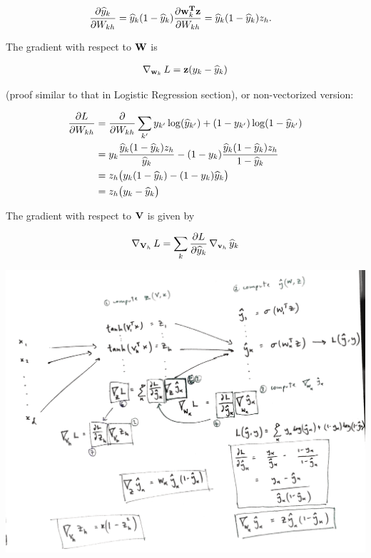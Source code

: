 \begin{align*}
  \frac{\partial \widehat{y}_k}{\partial W_{kh}} &= \widehat{y}_k (1 - \widehat{y}_k) \frac{\partial \mathbf w_k^{\mathbf{T}} \mathbf z}{\partial W_{kh}} = \widehat{y}_k (1 - \widehat{y}_k)z_h.
\end{align*}

The gradient with respect to $\mathbf W$ is

\begin{align*}
  \operatorname{\nabla}_{\mathbf w_k} L = \mathbf z(y_k - \widehat{y}_k)
\end{align*}

(proof similar to that in Logistic Regression section), or non-vectorized version:

\begin{align*}
  \frac{\partial L}{\partial W_{kh}}
  &= \frac{\partial }{\partial W_{kh}} \sum_{k'} y_{k'} \log(\widehat{y}_{k'}) + (1 - y_{k'}) \log( 1 - \widehat{y}_{k'}) \\
  &=        y_k      \frac{ \widehat{y}_k (1 - \widehat{y}_k)z_h }{ \widehat{y}_k } -
           (1 - y_k) \frac{ \widehat{y}_k (1 - \widehat{y}_k)z_h}{ 1 - \widehat{y}_k} \\
  &= z_h \big(y_k (1 - \widehat{y}_k) - (1 - y_k) \widehat{y}_k \big) \\
  &= z_h \big(y_k - \widehat{y}_k\big)
\end{align*}

The gradient with respect to $\mathbf V$ is given by


\begin{align*}
  \operatorname{\nabla}_{\mathbf V_h} L = \sum_k \frac{\partial L}{\partial \widehat{y}_k} \operatorname{\nabla}_{\mathbf v_h} \widehat{y}_k
\end{align*}

\includegraphics[width=500pt]{img/machine-learning-neural-net-backpropagation-1.png}

